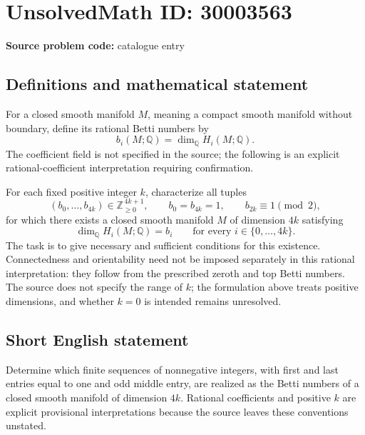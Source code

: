 \documentclass[11pt]{article}
\newcommand{\Z}{\mathbb{Z}}
\newcommand{\Q}{\mathbb{Q}}
\begin{document}
\section*{UnsolvedMath ID: 30003563}
\textbf{Source problem code:} catalogue entry
\subsection{Definitions and mathematical statement}
For a closed smooth manifold \(M\), meaning a compact smooth manifold without boundary, define its rational Betti numbers by
\[
 b_i(M;\Q)=\dim_{\Q}H_i(M;\Q).
\]
The coefficient field is not specified in the source; the following is an explicit rational-coefficient interpretation requiring confirmation.

For each fixed positive integer \(k\), characterize all tuples
\[
 (b_0,\ldots,b_{4k})\in\Z_{\geq 0}^{\,4k+1},
 \qquad b_0=b_{4k}=1,\qquad b_{2k}\equiv 1\pmod 2,
\]
for which there exists a closed smooth manifold \(M\) of dimension \(4k\) satisfying
\[
 \dim_{\Q}H_i(M;\Q)=b_i
 \qquad\text{for every }i\in\{0,\ldots,4k\}.
\]
The task is to give necessary and sufficient conditions for this existence. Connectedness and orientability need not be imposed separately in this rational interpretation: they follow from the prescribed zeroth and top Betti numbers. The source does not specify the range of \(k\); the formulation above treats positive dimensions, and whether \(k=0\) is intended remains unresolved.
\subsection{Short English statement}
Determine which finite sequences of nonnegative integers, with first and last entries equal to one and odd middle entry, are realized as the Betti numbers of a closed smooth manifold of dimension \(4k\). Rational coefficients and positive \(k\) are explicit provisional interpretations because the source leaves these conventions unstated.
\end{document}
